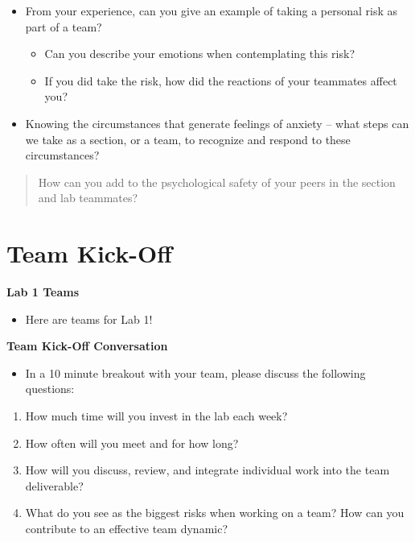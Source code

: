 \documentclass[
]{book}
\providecommand{\tightlist}{%
  \setlength{\itemsep}{0pt}\setlength{\parskip}{0pt}}
\theoremstyle{definition}
\theoremstyle{definition}
\theoremstyle{definition}
\theoremstyle{definition}
\theoremstyle{remark}
\begin{document}
\begin{itemize}
\tightlist
\item
  From your experience, can you give an example of taking a personal risk as part of a team?

  \begin{itemize}
  \tightlist
  \item
    Can you describe your emotions when contemplating this risk?
  \item
    If you did take the risk, how did the reactions of your teammates affect you?
  \end{itemize}
\item
  Knowing the circumstances that generate feelings of anxiety -- what steps can we take as a section, or a team, to recognize and respond to these circumstances?
\end{itemize}

\begin{quote}
How can you add to the psychological safety of your peers in the section and lab teammates?
\end{quote}

\hypertarget{team-kick-off}{%
\section{Team Kick-Off}\label{team-kick-off}}

\textbf{Lab 1 Teams}

\begin{itemize}
\tightlist
\item
  Here are teams for Lab 1!
\end{itemize}

\textbf{Team Kick-Off Conversation}

\begin{itemize}
\tightlist
\item
  In a 10 minute breakout with your team, please discuss the following questions:
\end{itemize}

\begin{enumerate}
\def\labelenumi{\arabic{enumi}.}
\tightlist
\item
  How much time will you invest in the lab each week?
\item
  How often will you meet and for how long?
\item
  How will you discuss, review, and integrate individual work into the team deliverable?
\item
  What do you see as the biggest risks when working on a team? How can you contribute to an effective team dynamic?
\end{enumerate}
\end{document}
